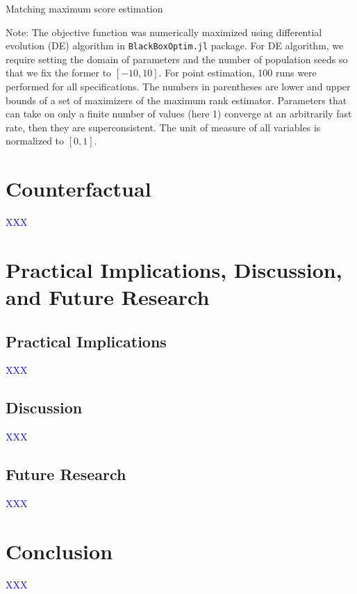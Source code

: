 \documentclass[10pt]{article}
\begin{document}
\begin{table}[!htbp]
  \begin{center}
      \caption{Matching maximum score estimation}
      \label{tb:maximum_score_estimate} 
      
  \end{center}\footnotesize
  Note: The objective function was numerically maximized using differential evolution (DE) algorithm in \texttt{BlackBoxOptim.jl} package. For DE algorithm, we require setting the domain of parameters and the number of population seeds so that we fix the former to $[-10, 10]$. For point estimation, 100 runs were performed for all specifications. The numbers in parentheses are lower and upper bounds of a set of maximizers of the maximum rank estimator.  Parameters that can take on only a finite number of values (here 1) converge at an arbitrarily fast rate, then they are superconsistent. The unit of measure of all variables is normalized to $[0,1]$. 
\end{table} 

\section{Counterfactual}\label{sec:counterfactuals}

\textcolor{blue}{XXX}

\section{Practical Implications, Discussion, and Future Research}\label{sec:practical_implications}

\subsection{Practical Implications}

\textcolor{blue}{XXX}

\subsection{Discussion}

\textcolor{blue}{XXX}

\subsection{Future Research}

\textcolor{blue}{XXX}


\section{Conclusion}\label{sec:conclusion}

\textcolor{blue}{XXX}



\end{document}
